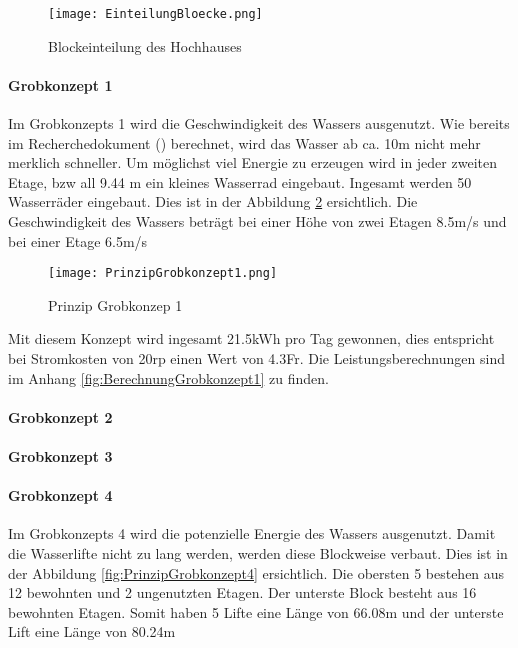 \begin{figure} [H]
	\centering
	\texttt{[image: EinteilungBloecke.png]}
	\caption{Blockeinteilung des Hochhauses}
	\label{fig:EinteilungBloecke}
\end{figure}

\newpage

\paragraph{Grobkonzept 1} 

Im Grobkonzepts 1 wird die Geschwindigkeit des Wassers ausgenutzt. Wie bereits im Recherchedokument (\cite{recherchedokument}) berechnet, wird das Wasser ab ca. 10m nicht mehr merklich schneller. Um möglichst viel Energie zu erzeugen wird in jeder zweiten Etage, bzw all 9.44 \si{m} ein kleines Wasserrad eingebaut. Ingesamt werden 50 Wasserräder eingebaut. Dies ist in der Abbildung \ref{fig:PrinzipGrobkonzept1}  ersichtlich. Die Geschwindigkeit des Wassers beträgt bei einer Höhe von zwei Etagen 8.5\si{m/s} und bei einer Etage 6.5\si{m/s}

\begin{figure} [H]
	\centering
	\texttt{[image: PrinzipGrobkonzept1.png]}
	\caption{Prinzip Grobkonzep 1}
	\label{fig:PrinzipGrobkonzept1}
\end{figure}

Mit diesem Konzept wird ingesamt 21.5\si{kWh} pro Tag gewonnen, dies entspricht bei Stromkosten von 20\si{rp} einen Wert von 4.3\si{Fr}. Die Leistungsberechnungen sind im Anhang \ref{fig:BerechnungGrobkonzept1}  zu finden.

\paragraph{Grobkonzept 2}

\paragraph{Grobkonzept 3}

\paragraph{Grobkonzept 4}

Im Grobkonzepts 4 wird die potenzielle Energie des Wassers ausgenutzt. Damit die Wasserlifte nicht zu lang werden, werden diese Blockweise verbaut. Dies ist in der Abbildung \ref{fig:PrinzipGrobkonzept4}  ersichtlich. Die obersten 5 bestehen aus 12 bewohnten und 2 ungenutzten Etagen. Der unterste Block besteht aus 16 bewohnten Etagen. Somit haben 5 Lifte eine Länge von 66.08\si{m} und der unterste Lift eine Länge von 80.24\si{m}

